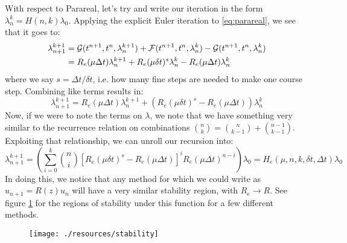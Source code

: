 With respect to Parareal, let's try and write our iteration in the form
$\lambda_n^k = H(n,k)\lambda_0$. Applying the explicit Euler iteration to
\ref{eq:parareal}, we see that it goes to:
\begin{align*}
  \lambda_{n+1}^{k+1} & = \mathcal{G}(t^{n+1},t^n,\lambda_n^{k+1}) +
  \mathcal{F}(t^{n+1},t^n,\lambda_n^k) -
  \mathcal{G}(t^{n+1},t^n,\lambda_n^k) \\
  & = R_e(\mu\Delta t)\lambda_n^{k+1} + 
  R_e(\mu\delta t)^s \lambda_n^k -
  R_e(\mu\Delta t)\lambda_n^k \\
\end{align*}
where we say $s = \Delta t/ \delta t$, i.e. how many fine steps are needed to
make one course step. Combining like terms results in:
\[
  \lambda_{n+1}^{k+1} = 
  R_e(\mu\Delta t)\lambda_n^{k+1} + 
  \left( R_e(\mu\delta t)^s - R_e(\mu\Delta t)\right) \lambda_n^k 
\]
Now, if we were to note the terms on $\lambda$, we note that we have something
very similar to the recurrence relation on combinations $\binom{n}{k} =
\binom{n}{k-1} + \binom{n-1}{k-1}$. Exploiting that relationship, we can unroll
our recursion into:
\[
  \lambda_{n+1}^{k+1} = \left( \sum_{i=0}^k \binom{n}{i} \left[R_e(\mu \delta t)^s -
    R_e(\mu \Delta t)\right]^i R_e(\mu \Delta t)^{n-i} \right) \lambda_0 =
    H_e(\mu, n,k,\delta t, \Delta t) \lambda_0
\]
In doing this, we notice that any method for which we could write as $u_{n+1} =
R(z) u_n$ will have a very similar stability region, with $R_e \to R$. See
figure \ref{fig:stability} for the regions of stability under this function for
a few different methods.

\begin{figure}[!htb]
  \centering
  \texttt{[image: ./resources/stability]}
  \caption{}\label{fig:stability}
\end{figure}
